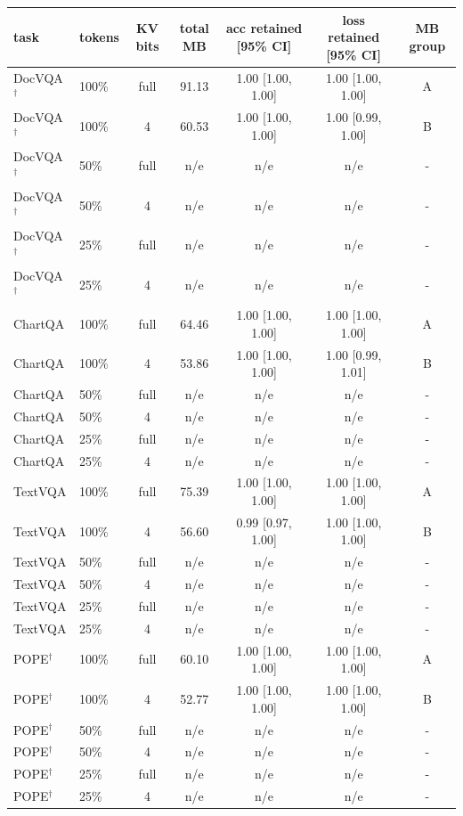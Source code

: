 \begin{tabular}{llcccc c}
\toprule
task & tokens & KV bits & total MB & acc retained [95\% CI] & loss retained [95\% CI] & MB group \\
\midrule
DocVQA$^\dagger$ & 100\% & full & 91.13 & 1.00 {\scriptsize[1.00, 1.00]} & 1.00 {\scriptsize[1.00, 1.00]} & A \\
DocVQA$^\dagger$ & 100\% & 4 & 60.53 & 1.00 {\scriptsize[1.00, 1.00]} & 1.00 {\scriptsize[0.99, 1.00]} & B \\
DocVQA$^\dagger$ & 50\% & full & n/e & n/e & n/e & - \\
DocVQA$^\dagger$ & 50\% & 4 & n/e & n/e & n/e & - \\
DocVQA$^\dagger$ & 25\% & full & n/e & n/e & n/e & - \\
DocVQA$^\dagger$ & 25\% & 4 & n/e & n/e & n/e & - \\
\midrule
ChartQA & 100\% & full & 64.46 & 1.00 {\scriptsize[1.00, 1.00]} & 1.00 {\scriptsize[1.00, 1.00]} & A \\
ChartQA & 100\% & 4 & 53.86 & 1.00 {\scriptsize[1.00, 1.00]} & 1.00 {\scriptsize[0.99, 1.01]} & B \\
ChartQA & 50\% & full & n/e & n/e & n/e & - \\
ChartQA & 50\% & 4 & n/e & n/e & n/e & - \\
ChartQA & 25\% & full & n/e & n/e & n/e & - \\
ChartQA & 25\% & 4 & n/e & n/e & n/e & - \\
\midrule
TextVQA & 100\% & full & 75.39 & 1.00 {\scriptsize[1.00, 1.00]} & 1.00 {\scriptsize[1.00, 1.00]} & A \\
TextVQA & 100\% & 4 & 56.60 & 0.99 {\scriptsize[0.97, 1.00]} & 1.00 {\scriptsize[1.00, 1.00]} & B \\
TextVQA & 50\% & full & n/e & n/e & n/e & - \\
TextVQA & 50\% & 4 & n/e & n/e & n/e & - \\
TextVQA & 25\% & full & n/e & n/e & n/e & - \\
TextVQA & 25\% & 4 & n/e & n/e & n/e & - \\
\midrule
POPE$^\dagger$ & 100\% & full & 60.10 & 1.00 {\scriptsize[1.00, 1.00]} & 1.00 {\scriptsize[1.00, 1.00]} & A \\
POPE$^\dagger$ & 100\% & 4 & 52.77 & 1.00 {\scriptsize[1.00, 1.00]} & 1.00 {\scriptsize[1.00, 1.00]} & B \\
POPE$^\dagger$ & 50\% & full & n/e & n/e & n/e & - \\
POPE$^\dagger$ & 50\% & 4 & n/e & n/e & n/e & - \\
POPE$^\dagger$ & 25\% & full & n/e & n/e & n/e & - \\
POPE$^\dagger$ & 25\% & 4 & n/e & n/e & n/e & - \\
\bottomrule
\end{tabular}
